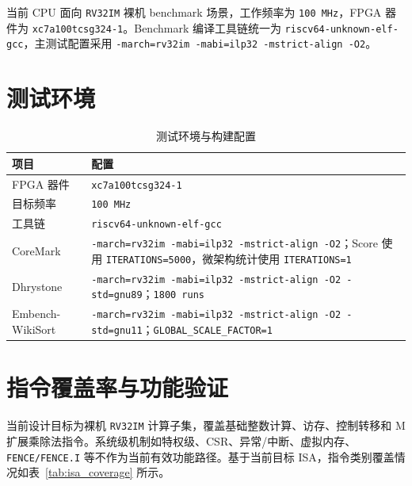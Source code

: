 ﻿\documentclass[UTF8,a4paper,12pt]{ctexart}
\begin{document}
当前 CPU 面向 \texttt{RV32IM} 裸机 benchmark 场景，工作频率为 \texttt{100 MHz}，FPGA 器件为 \texttt{xc7a100tcsg324-1}。Benchmark 编译工具链统一为 \texttt{riscv64-unknown-elf-gcc}，主测试配置采用 \texttt{-march=rv32im -mabi=ilp32 -mstrict-align -O2}。

\section{测试环境}

\begin{table}[htbp]
    \centering
    \caption{测试环境与构建配置}
    \begin{tabularx}{\textwidth}{C{3.0cm}Y}
        \toprule
        项目 & 配置 \\
        \midrule
        FPGA 器件 & \texttt{xc7a100tcsg324-1} \\
        目标频率 & \texttt{100 MHz} \\
        工具链 & \texttt{riscv64-unknown-elf-gcc} \\
        CoreMark & \texttt{-march=rv32im -mabi=ilp32 -mstrict-align -O2}；Score 使用 \texttt{ITERATIONS=5000}，微架构统计使用 \texttt{ITERATIONS=1} \\
        Dhrystone & \texttt{-march=rv32im -mabi=ilp32 -mstrict-align -O2 -std=gnu89}；\texttt{1800 runs} \\
        Embench-WikiSort & \texttt{-march=rv32im -mabi=ilp32 -mstrict-align -O2 -std=gnu11}；\texttt{GLOBAL\_SCALE\_FACTOR=1} \\
        \bottomrule
    \end{tabularx}
\end{table}

\section{指令覆盖率与功能验证}

当前设计目标为裸机 \texttt{RV32IM} 计算子集，覆盖基础整数计算、访存、控制转移和 M 扩展乘除法指令。系统级机制如特权级、CSR、异常/中断、虚拟内存、\texttt{FENCE/FENCE.I} 等不作为当前有效功能路径。基于当前目标 ISA，指令类别覆盖情况如表~\ref{tab:isa_coverage} 所示。
\end{document}
